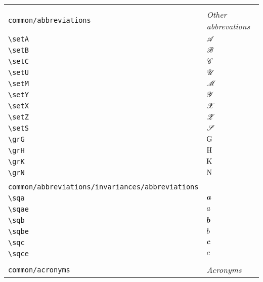 \begin{longtable}{lll}
 \hline
\hline
 &  & \\ 
 {\color[rgb]{0.5,0.5,0.5}\texttt{common/abbreviations}} & \multicolumn{2}{l}{\emph{Other abbrevations}}\\ 
 \hline
{\color[rgb]{0.5,0.5,0.5}\texttt{\textbackslash setA}} & $\mathscr{A}$ & \\ 
 {\color[rgb]{0.5,0.5,0.5}\texttt{\textbackslash setB}} & $\mathscr{B}$ & \\ 
 {\color[rgb]{0.5,0.5,0.5}\texttt{\textbackslash setC}} & $\mathscr{C}$ & \\ 
 {\color[rgb]{0.5,0.5,0.5}\texttt{\textbackslash setU}} & $\mathscr{U}$ & \\ 
 {\color[rgb]{0.5,0.5,0.5}\texttt{\textbackslash setM}} & $\mathscr{M}$ & \\ 
 {\color[rgb]{0.5,0.5,0.5}\texttt{\textbackslash setY}} & $\mathscr{Y}$ & \\ 
 {\color[rgb]{0.5,0.5,0.5}\texttt{\textbackslash setX}} & $\mathscr{X}$ & \\ 
 {\color[rgb]{0.5,0.5,0.5}\texttt{\textbackslash setZ}} & $\mathscr{Z}$ & \\ 
 {\color[rgb]{0.5,0.5,0.5}\texttt{\textbackslash setS}} & $\mathscr{S}$ & \\ 
 {\color[rgb]{0.5,0.5,0.5}\texttt{\textbackslash grG}} & $\mathrm{G}$ & \\ 
 {\color[rgb]{0.5,0.5,0.5}\texttt{\textbackslash grH}} & $\mathrm{H}$ & \\ 
 {\color[rgb]{0.5,0.5,0.5}\texttt{\textbackslash grK}} & $\mathrm{K}$ & \\ 
 {\color[rgb]{0.5,0.5,0.5}\texttt{\textbackslash grN}} & $\mathrm{N}$ & \\ 
  &  & \\ 
 {\color[rgb]{0.5,0.5,0.5}\texttt{common/abbreviations/invariances/abbreviations}} & \multicolumn{2}{l}{\emph{}}\\ 
 \hline
{\color[rgb]{0.5,0.5,0.5}\texttt{\textbackslash sqa}} & $\boldsymbol{a}$ & \\ 
 {\color[rgb]{0.5,0.5,0.5}\texttt{\textbackslash sqae}} & $a$ & \\ 
 {\color[rgb]{0.5,0.5,0.5}\texttt{\textbackslash sqb}} & $\boldsymbol{b}$ & \\ 
 {\color[rgb]{0.5,0.5,0.5}\texttt{\textbackslash sqbe}} & $b$ & \\ 
 {\color[rgb]{0.5,0.5,0.5}\texttt{\textbackslash sqc}} & $\boldsymbol{c}$ & \\ 
 {\color[rgb]{0.5,0.5,0.5}\texttt{\textbackslash sqce}} & $c$ & \\ 
  &  & \\ 
 {\color[rgb]{0.5,0.5,0.5}\texttt{common/acronyms}} & \multicolumn{2}{l}{\emph{Acronyms}}\\ 

\end{longtable}
